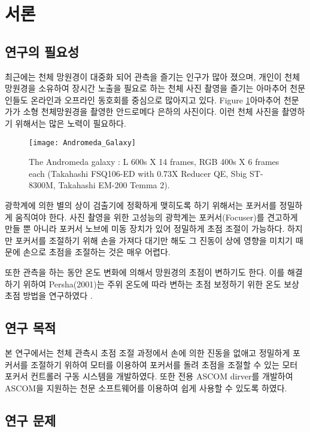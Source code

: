 \section{서론}

\subsection{연구의 필요성}

최근에는 천체 망원경이 대중화 되어 관측을 즐기는 인구가 많아 졌으며, 개인이 천체 망원경을 소유하여 장시간 노출을 필요로 하는 천체 사진 촬영을 즐기는 아마추어 천문인들도 온라인과 오프라인 동호회를 중심으로 많아지고 있다. Figure \ref{fig:The_Andromeda_Galaxy}\은 아마추어 천문가가 소형 천체망원경을 촬영한 안드로메다 은하의 사진이다. 이런 천체 사진을 촬영하기 위해서는 많은 노력이 필요하다.
\begin{figure}[h]
	\begin{center}
		\texttt{[image: Andromeda\_Galaxy]}
		\caption{The Andromeda galaxy : L 600s X 14 frames, RGB 400s X 6 frames each (Takahashi FSQ106-ED with 0.73X Reducer QE, Sbig ST-8300M, Takahashi EM-200 Temma 2).}
		\label{fig:The_Andromeda_Galaxy}
	\end{center}
\end{figure}



광학계에 의한 별의 상이 검출기에 정확하게 맺히도록 하기 위해서는 포커서를 정밀하게 움직여야 한다. 사진 촬영을 위한 고성능의 광학계는 포커서(Focuser)를 견고하게 만들 뿐 아니라 포커서 노브에 미동 장치가 있어 정밀하게 초점 조절이 가능하다. 하지만 포커서를 조절하기 위해 손을 가져다 대기만 해도 그 진동이 상에 영향을 미치기 때문에 손으로 초점을 조절하는 것은 매우 어렵다. 

또한 관측을 하는 동안 온도 변화에 의해서 망원경의 초점이 변하기도 한다. 이를 해결하기 위하여 Persha(2001)는 주위 온도에 따라 변하는 초점 보정하기 위한 온도 보상 초점 방법을 연구하였다 \cite{persha2001temperature}.


\subsection{연구 목적}

본 연구에서는 천체 관측시 초점 조절 과정에서 손에 의한 진동을 없애고 정밀하게 포커서를 조절하기 위하여 모터를 이용하여 포커서를 돌려 초점을 조절할 수 있는 모터 포커서 컨트롤러 구동 시스템을 개발하였다. 또한 전용 ASCOM dirver를 개발하여 ASCOM을 지원하는 천문 소프트웨어를 이용하여 쉽게 사용할 수 있도록 하였다. 


\subsection{연구 문제}

